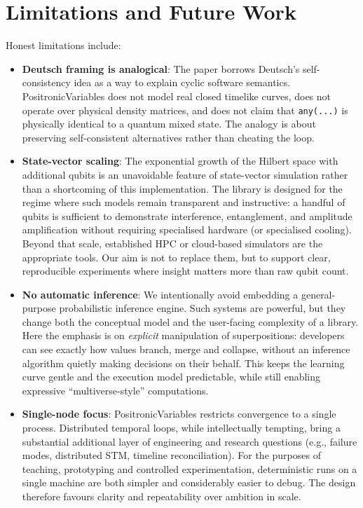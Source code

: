 \documentclass[a4paper,11pt]{article}
\begin{document}
\section{Limitations and Future Work}

Honest limitations include:

\begin{itemize}
\item
  \textbf{Deutsch framing is analogical}: The paper borrows Deutsch's self-consistency
  idea as a way to explain cyclic software semantics. PositronicVariables does not
  model real closed timelike curves, does not operate over physical density matrices,
  and does not claim that \texttt{any(...)} is physically identical to a quantum mixed
  state. The analogy is about preserving self-consistent alternatives rather than
  cheating the loop.
\item
  \textbf{State-vector scaling}: The exponential growth of the Hilbert space with additional qubits is an unavoidable feature of state-vector simulation rather than a shortcoming of this implementation. The library is designed for the regime where such models remain transparent and instructive: a handful of qubits is sufficient to demonstrate interference, entanglement, and amplitude amplification without requiring specialised hardware (or specialised cooling). Beyond that scale, established HPC or cloud-based simulators are the appropriate tools. Our aim is not to replace them, but to support clear, reproducible experiments where insight matters more than raw qubit count.
\item
  \textbf{No automatic inference}: We intentionally avoid embedding a general-purpose probabilistic inference engine. Such systems are powerful, but they change both the conceptual model and the user-facing complexity of a library. Here the emphasis is on \emph{explicit} manipulation of superpositions: developers can see exactly how values branch, merge and collapse, without an inference algorithm quietly making decisions on their behalf. This keeps the learning curve gentle and the execution model predictable, while still enabling expressive ``multiverse-style'' computations.
\item
  \textbf{Single-node focus}: PositronicVariables restricts convergence to a single process. Distributed temporal loops, while intellectually tempting, bring a substantial additional layer of engineering and research questions (e.g., failure modes, distributed STM, timeline reconciliation). For the purposes of teaching, prototyping and controlled experimentation, deterministic runs on a single machine are both simpler and considerably easier to debug. The design therefore favours clarity and repeatability over ambition in scale.
\end{itemize}
\end{document}
